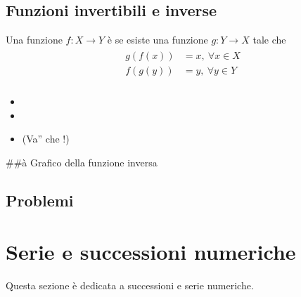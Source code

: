 \documentclass[letterpaper,10pt,italian]{jupyterBook}
\begin{document}
\section{Funzioni invertibili e inverse}
\label{\detokenize{ch/precalculus/real-functions:funzioni-invertibili-e-inverse}}\label{\detokenize{ch/precalculus/real-functions:math-hs-precalculus-real-functions-inverse}}
\sphinxAtStartPar
Una funzione \(f: X \rightarrow Y\) è  se esiste una funzione \(g: Y \rightarrow X\) tale che
\begin{equation*}
\begin{split}\begin{aligned}
  g\left( f(x) \right) & = x , \ \forall x \in X \\
  f\left( g(y) \right) & = y , \ \forall y \in Y \\
\end{aligned}\end{split}
\end{equation*}\begin{itemize}
\item {} 
\sphinxAtStartPar
{}

\item {} 
\sphinxAtStartPar
{}

\item {} 
\sphinxAtStartPar
{} (Va” che {\hyperref[\detokenize{ch/logics:logics-syllogism}]{}}!)

\end{itemize}
\label{\detokenize{ch/precalculus/real-functions:math-hs-precalculus-real-functions-inverse-plot}}
\sphinxAtStartPar
\#\#à Grafico della funzione inversa


\section{Problemi}
\label{\detokenize{ch/precalculus/real-functions:problemi}}\label{\detokenize{ch/precalculus/real-functions:math-hs-precalculus-real-functions-problems}}
\sphinxAtStartPar
{}

\sphinxstepscope




\chapter{Serie e successioni numeriche}
\label{\detokenize{ch/series:serie-e-successioni-numeriche}}\label{\detokenize{ch/series:math-hs-sequence-series-numerical-real}}\label{\detokenize{ch/series::doc}}
\sphinxAtStartPar
Questa sezione è dedicata a successioni e serie numeriche.
\end{document}
